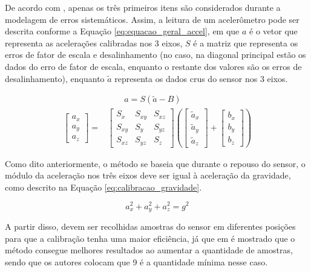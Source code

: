 \documentclass[acronym, symbols, table]{fei}
\begin{document}
			De acordo com \textcite{hassan2020field}, apenas os três primeiros itens são considerados durante a modelagem de erros sistemáticos. Assim, a leitura de um acelerômetro pode ser descrita conforme a Equação \ref{eq:equacao_geral_accel}, em que $a$ é o vetor que representa as acelerações calibradas nos 3 eixos, $S$ é a matriz que representa os erros de fator de escala e desalinhamento (no caso, na diagonal principal estão os dados do erro de fator de escala, enquanto o restante dos valores são os erros de desalinhamento), enquanto $\tilde{a}$ representa os dados crus do sensor nos 3 eixos.
			
			\begin{equation}\label{eq:equacao_geral_accel}
				\begin{split}
					&\quad \quad a = S(\tilde{a} - B) \\
					\begin{bmatrix}
						a_x \\ a_y \\ a_z
					\end{bmatrix} = 
					&\begin{bmatrix}
						S_x & S_{xy} & S_{xz} \\ S_{xy} & S_y & S_{yz} \\ S_{xz} & S_{yz} & S_z
					\end{bmatrix} \left(
					\begin{bmatrix}
						\tilde{a}_x \\ \tilde{a}_y \\ \tilde{a}_z
					\end{bmatrix} + 
					\begin{bmatrix}
						b_x \\ b_y \\ b_z
					\end{bmatrix}\right)
				\end{split}
			\end{equation}
			
			Como dito anteriormente, o método se baseia que durante o repouso do sensor, o módulo da aceleração nos três eixos deve ser igual à aceleração da gravidade, como descrito na Equação \ref{eq:calibracao_gravidade}.
			
			\begin{equation} \label{eq:calibracao_gravidade}
				a_{x}^{2} + a_{y}^{2} + a_{z}^{2} = g^{2}
			\end{equation}
			
			A partir disso, devem ser recolhidas amostras do sensor em diferentes posições para que a calibração tenha uma maior eficiência, já que em \textcite{menezes2020triaxial} é mostrado que o método consegue melhores resultados ao aumentar a quantidade de amostras, sendo que os autores colocam que 9 é a quantidade mínima nesse caso.
			
\end{document}
